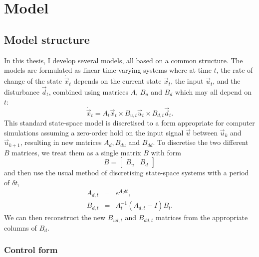 \chapter{Model}

\section{Model structure}

In this thesis, I develop several models, all based on a common structure.
The models are formulated as linear time-varying systems where at time $t$, the rate of change of the state $\dot{\vec{x}}_t$ depends on the current state $\vec{x}_t$, the input $\vec{u}_t$, and the disturbance $\vec{d}_t$, combined using matrices $A$, $B_u$ and $B_d$ which may all depend on $t$:
\begin{equation}
	\dot{\vec{x}}_t = A_t \vec{x}_t \times B_{u, t} \vec{u}_t \times B_{d, t} \vec{d}_t.
	\label{eq:xdot}
\end{equation}
This standard state-space model is discretised to a form appropriate for computer simulations assuming a zero-order hold on the input signal $\vec{u}$ between $\vec{u}_k$ and $\vec{u}_{k+1}$, resulting in new matrices $A_d, B_{du}$ and $B_{dd}$.
To discretise the two different $B$ matrices, we treat them as a single matrix $B$ with form
\begin{displaymath}
	B = \left[\begin{array}{cc}
		B_u & B_d
	\end{array}\right]
\end{displaymath}
and then use the usual method of discretising state-space systems with a period of $\delta t$,
\begin{eqnarray}
	A_{d, t} &=& e^{A_t \delta t}, \\
	B_{d, t} &=& A_t^{-1} (A_{d, t} - I) B_t.
\end{eqnarray}
We can then reconstruct the new $B_{ud, t}$ and $B_{dd, t}$ matrices from the appropriate columns of $B_d$.

\subsection{Control form}

